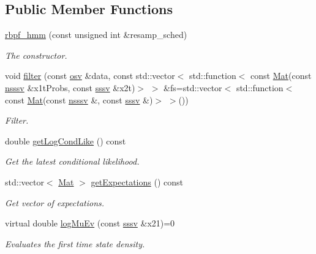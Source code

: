 \subsection*{Public Member Functions}
\begin{DoxyCompactItemize}
\item 
\hyperlink{classrbpf__hmm_a1598acef2616514ddd2fed7bfd5d8f20}{rbpf\+\_\+hmm} (const unsigned int \&resamp\+\_\+sched)
\begin{DoxyCompactList}\small\item\em The constructor. \end{DoxyCompactList}\item 
void \hyperlink{classrbpf__hmm_a25bb385ac5975fdbb7f461d600fe9cef}{filter} (const \hyperlink{classrbpf__hmm_a6ce5868477ec9ad6eaa3b3b23e99e1ae}{osv} \&data, const std\+::vector$<$ std\+::function$<$ const \hyperlink{classrbpf__hmm_a5977cfebfd8736d3a54390f5a21d40b2}{Mat}(const \hyperlink{classrbpf__hmm_a87376e321cce5bd3211825c509d17440}{nsssv} \&x1t\+Probs, const \hyperlink{classrbpf__hmm_aa7d73e78fca38e3652890c5c3680dee9}{sssv} \&x2t)$>$ $>$ \&fs=std\+::vector$<$ std\+::function$<$ const \hyperlink{classrbpf__hmm_a5977cfebfd8736d3a54390f5a21d40b2}{Mat}(const \hyperlink{classrbpf__hmm_a87376e321cce5bd3211825c509d17440}{nsssv} \&, const \hyperlink{classrbpf__hmm_aa7d73e78fca38e3652890c5c3680dee9}{sssv} \&)$>$ $>$())
\begin{DoxyCompactList}\small\item\em Filter. \end{DoxyCompactList}\item 
double \hyperlink{classrbpf__hmm_aaceb6993d215769a54ba225252a80a45}{get\+Log\+Cond\+Like} () const 
\begin{DoxyCompactList}\small\item\em Get the latest conditional likelihood. \end{DoxyCompactList}\item 
std\+::vector$<$ \hyperlink{classrbpf__hmm_a5977cfebfd8736d3a54390f5a21d40b2}{Mat} $>$ \hyperlink{classrbpf__hmm_a0e312a41dc41343a0b5bafacd7937372}{get\+Expectations} () const 
\begin{DoxyCompactList}\small\item\em Get vector of expectations. \end{DoxyCompactList}\item 
virtual double \hyperlink{classrbpf__hmm_ad81a38661eddbf87db154e74c20f303e}{log\+Mu\+Ev} (const \hyperlink{classrbpf__hmm_aa7d73e78fca38e3652890c5c3680dee9}{sssv} \&x21)=0
\begin{DoxyCompactList}\small\item\em Evaluates the first time state density. \end{DoxyCompactList}\item 

\end{DoxyCompactItemize}
